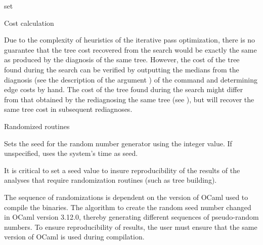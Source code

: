 \begin{command}{set}{}
\begin{arguments}
\begin{argumentgroup}{Cost calculation}
	        \begin{statement}
  	            Due to the complexity of heuristics of the iterative pass
                optimization, there is no guarantee that the tree cost recovered
                from the search would be exactly the same as produced by the
                diagnosis of the same tree.  However, the cost of the tree found
                during the search can be verified by outputting the medians from
                the diagnosis (see the description of the argument
                ) of the command
                 and determining edge costs by hand. The cost
                of the tree found during the search might differ from that
                obtained by the rediagnosing the same tree (see
                ), but will recover the same
                tree cost in subsequent rediagnoses. 
            \end{statement}
	
        \end{argumentgroup}

        \begin{argumentgroup}{Randomized routines}
            {}

                {Sets the seed for the random number generator using the integer 
                value. If unspecified, \poy uses the system's time as seed.}
                {}
        	\begin{statement}
  	            It is critical to set a seed value to insure reproducibility of
                the results of the analyses that require randomization routines
                (such as tree building).
	        \end{statement}
	 
	        \begin{statement}
	            The sequence of randomizations is dependent on the version of
                OCaml used to compile the binaries. The algorithm to create the
                random seed number changed in OCaml version 3.12.0, thereby
                generating different sequences of pseudo-random numbers.  To
                ensure reproducibility of results, the user must ensure that the
                same version of OCaml is used during compilation.
            \end{statement}
	
        \end{argumentgroup}
	\end{arguments}


\end{command}
